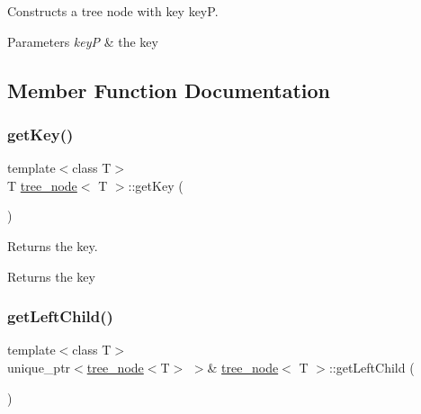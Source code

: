Constructs a tree node with key keyP. 
\begin{DoxyParams}{Parameters}
{\em keyP} & the key \\
\hline
\end{DoxyParams}


\subsection{Member Function Documentation}
\mbox{\label{classtree__node_afbe2d91ad009570338290ed9eb8a7485}} 
\subsubsection{\texorpdfstring{get\+Key()}{getKey()}}
{\footnotesize\ttfamily template$<$class T$>$ \\
T \hyperlink{classtree__node}{tree\+\_\+node}$<$ T $>$\+::get\+Key (\begin{DoxyParamCaption}{ }\end{DoxyParamCaption})\hspace{0.3cm}{\ttfamily [inline]}}

Returns the key. \begin{DoxyReturn}{Returns}
the key 
\end{DoxyReturn}
\mbox{\label{classtree__node_ae161b70a3780e0cb3ecd4b57acc9e2d1}} 
\subsubsection{\texorpdfstring{get\+Left\+Child()}{getLeftChild()}}
{\footnotesize\ttfamily template$<$class T$>$ \\
unique\+\_\+ptr$<$\hyperlink{classtree__node}{tree\+\_\+node}$<$T$>$ $>$\& \hyperlink{classtree__node}{tree\+\_\+node}$<$ T $>$\+::get\+Left\+Child (\begin{DoxyParamCaption}{ }\end{DoxyParamCaption})\hspace{0.3cm}{\ttfamily [inline]}}

